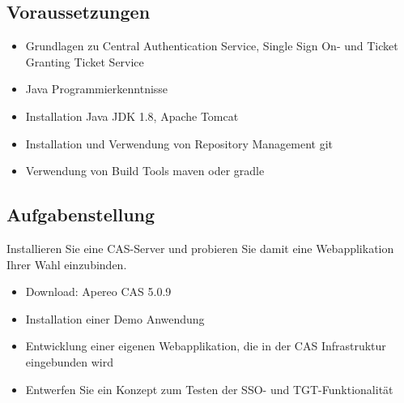 \subsection{Voraussetzungen}
\begin{itemize}
	\item Grundlagen zu Central Authentication Service, Single Sign On- und Ticket Granting Ticket Service
	\item Java Programmierkenntnisse
	\item Installation Java JDK 1.8, Apache Tomcat
	\item Installation und Verwendung von Repository Management git
	\item Verwendung von Build Tools maven oder gradle
\end{itemize}


\subsection{Aufgabenstellung}
Installieren Sie eine CAS-Server und probieren Sie damit eine Webapplikation Ihrer Wahl einzubinden.
\begin{itemize}
	\item Download: Apereo CAS 5.0.9
	\item Installation einer Demo Anwendung
	\item Entwicklung einer eigenen Webapplikation, die in der CAS Infrastruktur eingebunden wird
	\item Entwerfen Sie ein Konzept zum Testen der SSO- und TGT-Funktionalität
\end{itemize}
\clearpage
